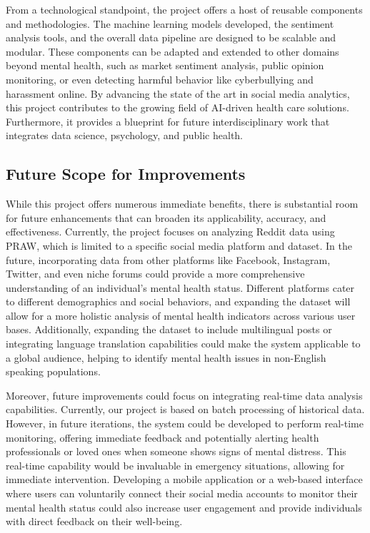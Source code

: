 \vspace{1em}
\noindent
From a technological standpoint, the project offers a host of reusable components and methodologies. The machine learning models developed, the sentiment analysis tools, and the overall data pipeline are designed to be scalable and modular. These components can be adapted and extended to other domains beyond mental health, such as market sentiment analysis, public opinion monitoring, or even detecting harmful behavior like cyberbullying and harassment online. By advancing the state of the art in social media analytics, this project contributes to the growing field of AI-driven health care solutions. Furthermore, it provides a blueprint for future interdisciplinary work that integrates data science, psychology, and public health. 

\subsection{Future Scope for Improvements}
\noindent
While this project offers numerous immediate benefits, there is substantial room for future enhancements that can broaden its applicability, accuracy, and effectiveness. Currently, the project focuses on analyzing Reddit data using PRAW, which is limited to a specific social media platform and dataset. In the future, incorporating data from other platforms like Facebook, Instagram, Twitter, and even niche forums could provide a more comprehensive understanding of an individual’s mental health status. Different platforms cater to different demographics and social behaviors, and expanding the dataset will allow for a more holistic analysis of mental health indicators across various user bases. Additionally, expanding the dataset to include multilingual posts or integrating language translation capabilities could make the system applicable to a global audience, helping to identify mental health issues in non-English speaking populations. 

\vspace{1em}
\noindent
Moreover, future improvements could focus on integrating real-time data analysis capabilities. Currently, our project is based on batch processing of historical data. However, in future iterations, the system could be developed to perform real-time monitoring, offering immediate feedback and potentially alerting health professionals or loved ones when someone shows signs of mental distress. This real-time capability would be invaluable in emergency situations, allowing for immediate intervention. Developing a mobile application or a web-based interface where users can voluntarily connect their social media accounts to monitor their mental health status could also increase user engagement and provide individuals with direct feedback on their well-being.

